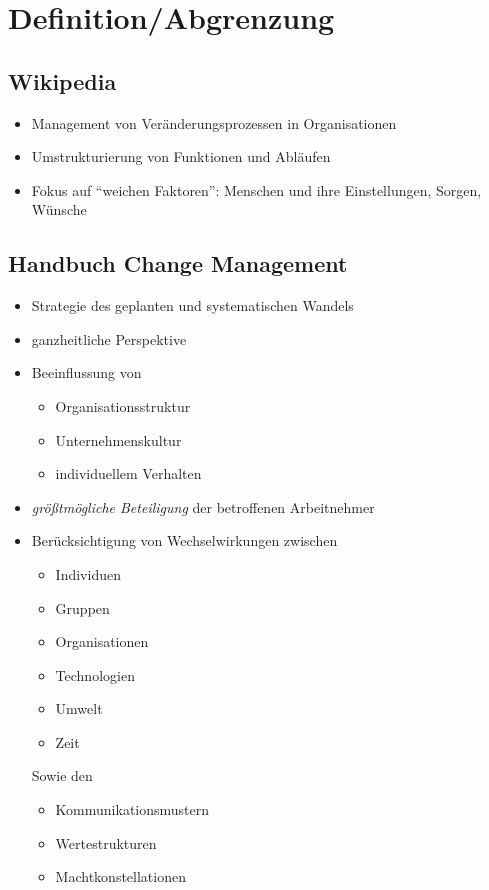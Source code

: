 \documentclass[a4paper, 12pt]{article}
\begin{document}
\tableofcontents
\pagebreak



\section{Definition/Abgrenzung}


\subsection{Wikipedia}
\begin{itemize}
  \item Management von Veränderungsprozessen in Organisationen
  \item Umstrukturierung von Funktionen und Abläufen
  \item Fokus auf ``weichen Faktoren'': Menschen und ihre Einstellungen, Sorgen, Wünsche
\end{itemize}


\subsection{Handbuch Change Management}
\begin{itemize}
  \item Strategie des geplanten und systematischen Wandels
  \item ganzheitliche Perspektive
  \item Beeinflussung von
    \begin{itemize}
      \item Organisationsstruktur
      \item Unternehmenskultur
      \item individuellem Verhalten
    \end{itemize}
  \item \emph{größtmögliche Beteiligung} der betroffenen Arbeitnehmer
  \item Berücksichtigung von Wechselwirkungen zwischen
    \begin{itemize}
      \item Individuen
      \item Gruppen
      \item Organisationen
      \item Technologien
      \item Umwelt
      \item Zeit
    \end{itemize}
    Sowie den
    \begin{itemize}
      \item Kommunikationsmustern
      \item Wertestrukturen
      \item Machtkonstellationen
    \end{itemize}
\end{itemize}
\end{document}
